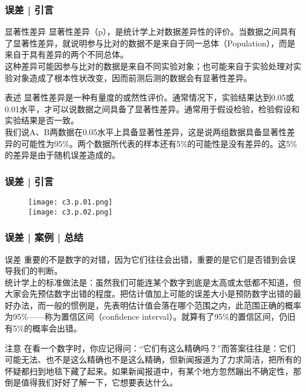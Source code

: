 \begin{frame}
  \frametitle{误差 | 引言}
  \begin{block}{显著性差异}
显著性差异（p），是统计学上对数据差异性的评价。当数据之间具有了显著性差异，就说明参与比对的数据不是来自于同一总体（Population），而是来自于具有差异的两个不同总体。\\
\vspace{0.3em}
  这种差异可能因参与比对的数据是来自不同实验对象；也可能来自于实验处理对实验对象造成了根本性状改变，因而前测后测的数据会有显著性差异。
  \end{block}
  \pause
  \begin{block}{表述}
    显著性差异是一种有量度的或然性评价。通常情况下，实验结果达到0.05或0.01水平，才可以说数据之间具备了显著性差异。通常用于假设检验，检验假设和实验结果是否一致。\\
    \vspace{0.3em}
我们说A、B两数据在0.05水平上具备显著性差异，这是说两组数据具备显著性差异的可能性为95\%。两个数据所代表的样本还有5\%的可能性是没有差异的。这5\%的差异是由于随机误差造成的。\\
  \end{block}
\end{frame}

\begin{frame}
  \frametitle{误差 | 引言}
  \begin{figure}
    \centering
    \texttt{[image: c3.p.01.png]}\\
    \texttt{[image: c3.p.02.png]}
  \end{figure}
\end{frame}

\begin{frame}
  \frametitle{误差 | 案例 | 总结}
  \begin{block}{误差}
    重要的不是数字的对错，因为它们往往会出错，重要的是它们是否错到会误导我们的判断。\\
    \vspace{0.3em}
统计学上的标准做法是：虽然我们可能连某个数字到底是太高或太低都不知道，但大家会先预估数字出错的程度。把估计值加上可能的误差大小是预防数字出错的最好办法，而一般的惯例是，先表明估计值会落在哪个范围之内，此范围正确的概率为95\%——称为置信区间（confidence interval）。就算有了95\%的置信区间，仍旧有5\%的概率会出错。
  \end{block}
  \pause
  \begin{block}{注意}
在看一个数字时，你应记得问：“它们有这么精确吗？”而答案往往是：它们可能无法、也不是这么精确也不是这么精确，但新闻报道为了力求简洁，把所有的怀疑都扫到地毯下藏了起来。如果新闻报道中，有某个地方忽然蹦出不确定性，那倒是值得我们好好了解一下，它想要表达什么。
  \end{block}
\end{frame}

